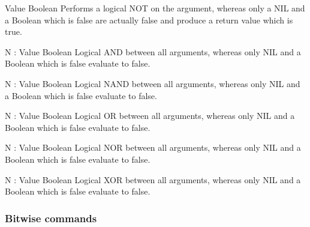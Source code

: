     \begin{commands}

                {Value}
                {Boolean}
                {
                    Performs a logical NOT on the argument, whereas only a NIL
                    and a Boolean which is false are actually false and produce
                    a return value which is true.
                }

                {N : Value}
                {Boolean}
                {
                    Logical AND between all arguments, whereas only NIL and a
                    Boolean which is false evaluate to false.
                }

                {N : Value}
                {Boolean}
                {
                    Logical NAND between all arguments, whereas only NIL and a
                    Boolean which is false evaluate to false.
                }

                {N : Value}
                {Boolean}
                {
                    Logical OR between all arguments, whereas only NIL and a
                    Boolean which is false evaluate to false.
                }

                {N : Value}
                {Boolean}
                {
                    Logical NOR between all arguments, whereas only NIL and a
                    Boolean which is false evaluate to false.
                }

                {N : Value}
                {Boolean}
                {
                    Logical XOR between all arguments, whereas only NIL and a
                    Boolean which is false evaluate to false.
                }

    \end{commands}

\subsubsection{Bitwise commands}

